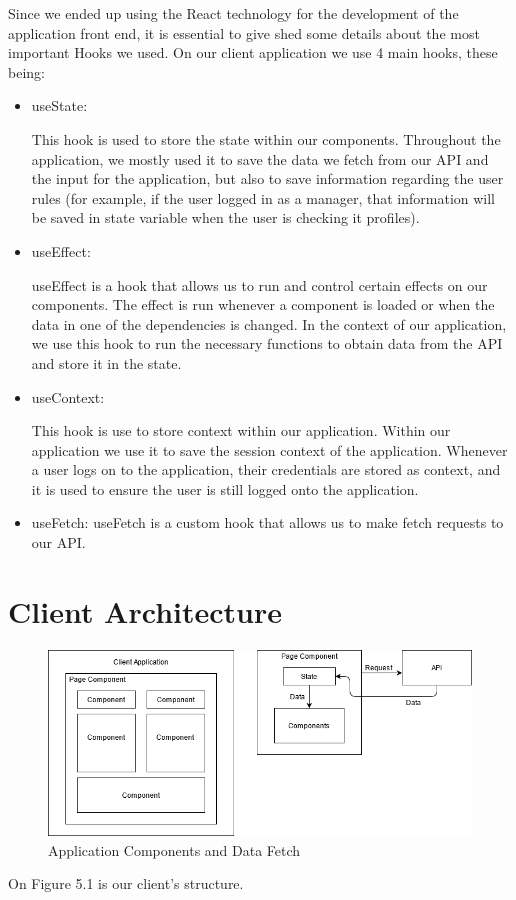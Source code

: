 \documentclass[a4paper,twoside,10pt]{report}
\begin{document}
Since we ended up using the React technology for the development of the application front end, it is essential to give shed some details about the most important Hooks we used.
\newline
On our client application we use 4 main hooks, these being:
\newpage
 \begin{itemize}
	\item useState\cite{USESTATE}:

This hook is used to store the state within our components. Throughout the application, we mostly used it to save the data we fetch from our API and the input for the application, but also to save information regarding the user rules (for example, if the user logged in as a manager, that information will be saved in state variable when the user is checking it profiles).
	\item useEffect\cite{USEEFFECT}:

useEffect is a hook that allows us to run and control certain effects on our components. The effect is run whenever a component is loaded or when the data in one of the dependencies is changed. In the context of our application, we use this hook to run the necessary functions to obtain data from the API and store it in the state.
	\item useContext\cite{USECONTEXT}:

This hook is use to store context within our application. Within our application we use it to save the session context of the application. Whenever a user logs on to the application, their credentials are stored as context, and it is used to ensure the user is still logged onto the application.
	\item useFetch\cite{USEFETCH}: useFetch is a custom hook that allows us to make fetch requests to our API.
\end{itemize}

\section{Client Architecture}
\begin{figure}[h!]
\center
    \includegraphics[width=\textwidth]{client app architecture.png}
\caption{Application Components and Data Fetch}
\end{figure}
On Figure 5.1 is our client's structure. 
\end{document}
